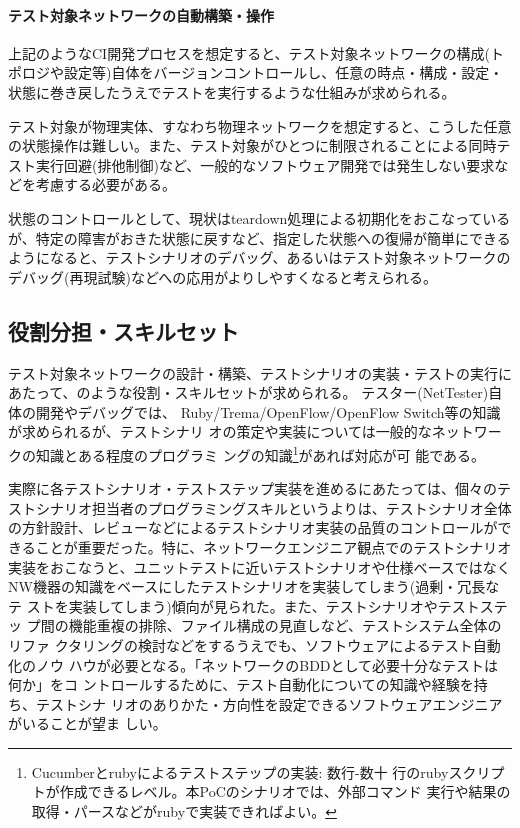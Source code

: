     \paragraph{テスト対象ネットワークの自動構築・操作}
上記のようなCI開発プロセスを想定すると、テスト対象ネットワークの構成(ト
ポロジや設定等)自体をバージョンコントロールし、任意の時点・構成・設定・
状態に巻き戻したうえでテストを実行するような仕組みが求められる。

テスト対象が物理実体、すなわち物理ネットワークを想定すると、こうした任意
の状態操作は難しい。また、テスト対象がひとつに制限されることによる同時テ
スト実行回避(排他制御)など、一般的なソフトウェア開発では発生しない要求な
どを考慮する必要がある。

状態のコントロールとして、現状はteardown処理による初期化をおこなっている
が、特定の障害がおきた状態に戻すなど、指定した状態への復帰が簡単にできる
ようになると、テストシナリオのデバッグ、あるいはテスト対象ネットワークの
デバッグ(再現試験)などへの応用がよりしやすくなると考えられる。

  \subsection{役割分担・スキルセット}

テスト対象ネットワークの設計・構築、テストシナリオの実装・テストの実行に
あたって、のような役割・スキルセットが求められる。
テスター(NetTester)自体の開発やデバッグでは、
Ruby/Trema/OpenFlow/OpenFlow Switch等の知識が求められるが、テストシナリ
オの策定や実装については一般的なネットワークの知識とある程度のプログラミ
ングの知識\footnote{Cucumberとrubyによるテストステップの実装: 数行-数十
行のrubyスクリプトが作成できるレベル。本PoCのシナリオでは、外部コマンド
実行や結果の取得・パースなどがrubyで実装できればよい。}があれば対応が可
能である。

実際に各テストシナリオ・テストステップ実装を進めるにあたっては、個々のテ
ストシナリオ担当者のプログラミングスキルというよりは、テストシナリオ全体
の方針設計、レビューなどによるテストシナリオ実装の品質のコントロールがで
きることが重要だった。特に、ネットワークエンジニア観点でのテストシナリオ
実装をおこなうと、ユニットテストに近いテストシナリオや仕様ベースではなく
NW機器の知識をベースにしたテストシナリオを実装してしまう(過剰・冗長なテ
ストを実装してしまう)傾向が見られた。また、テストシナリオやテストステッ
プ間の機能重複の排除、ファイル構成の見直しなど、テストシステム全体のリファ
クタリングの検討などをするうえでも、ソフトウェアによるテスト自動化のノウ
ハウが必要となる。「ネットワークのBDDとして必要十分なテストは何か」をコ
ントロールするために、テスト自動化についての知識や経験を持ち、テストシナ
リオのありかた・方向性を設定できるソフトウェアエンジニアがいることが望ま
しい。

